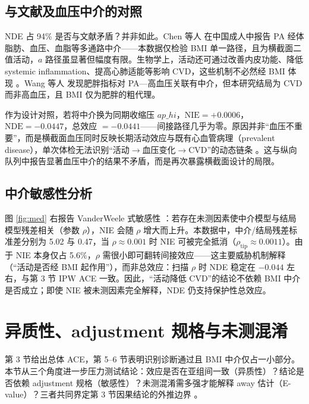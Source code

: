 \documentclass[12pt,a4paper]{article}
\begin{document}
\subsection{与文献及血压中介的对照}

NDE 占 94\% 是否与文献矛盾？并非如此。Chen 等人 \cite{chen2023pa} 在中国成人中报告 PA 经体脂肪、血压、血脂等多通路中介——本数据仅检验 BMI 单一路径，且为横截面二值活动，$a$ 路径虽显著但幅度有限。生物学上，活动还可通过改善内皮功能、降低 systemic inflammation、提高心肺适能等影响 CVD，这些机制不必然经 BMI 体现 \cite{bjsports2023crf,srep2025stiffness}。Wang 等人 \cite{wang2023obesity} 发现肥胖指标对 PA—高血压关联有中介，但本研究结局为 CVD 而非高血压，且 BMI 仅为肥胖的粗代理。

作为设计对照，若将中介换为同期收缩压 $ap\_hi$，$\mathrm{NIE}=+0.0006$，$\mathrm{NDE}=-0.0447$，总效应 $=-0.0441$——间接路径几乎为零。原因并非“血压不重要”，而是横截面血压同时反映长期活动效应与既有心血管病理（prevalent disease），单次体检无法识别“活动$\to$血压变化$\to$CVD”的动态链条 \cite{srep2025stiffness,hernan2024whatif}。这与纵向队列中报告显著血压中介的结果不矛盾，而是再次暴露横截面设计的局限。

\subsection{中介敏感性分析}

图 \ref{fig:med} 右报告 VanderWeele 式敏感性 \cite{vanderweele2015explanation}：若存在未测因素使中介模型与结局模型残差相关（参数 $\rho$），NIE 会随 $\rho$ 增大而上升。本数据中，中介/结局残差标准差分别为 5.02 与 0.47，当 $\rho\approx 0.001$ 时 NIE 可被完全抵消（$\rho_{\text{tip}}\approx 0.0011$）。由于 NIE 本身仅占 5.6\%，$\rho$ 需很小即可翻转间接效应——这主要威胁机制解释（“活动是否经 BMI 起作用”），而非总效应：扫描 $\rho$ 时 NDE 稳定在 $-0.044$ 左右，与第 3 节 IPW ACE 一致。因此，“活动降低 CVD”的结论不依赖 BMI 中介是否成立；即使 NIE 被未测因素完全解释，NDE 仍支持保护性总效应。

\section{异质性、adjustment 规格与未测混淆}

第 3 节给出总体 ACE，第 5–6 节表明识别诊断通过且 BMI 中介仅占一小部分。本节从三个角度进一步压力测试结论：效应是否在亚组间一致（异质性）？结论是否依赖 adjustment 规格（敏感性）？未测混淆需多强才能解释 away 估计（E-value）？三者共同界定第 3 节因果结论的外推边界 \cite{vanderweele2017evalue,hernan2024whatif}。
\end{document}

